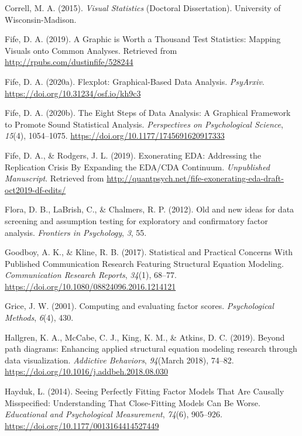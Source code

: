 \documentclass[
  english,
  doc]{apa6}
\newlength{\cslhangindent}
\newenvironment{cslreferences}%
  {\setlength{\parindent}{0pt}%
  \everypar{\setlength{\hangindent}{\cslhangindent}}\ignorespaces}%
  {\par}
\begin{document}
\begin{cslreferences}
\leavevmode\hypertarget{ref-Correll2015}{}%
Correll, M. A. (2015). \emph{Visual Statistics} (Doctoral Dissertation). University of Wisconsin-Madison.

\leavevmode\hypertarget{ref-Fife2019b}{}%
Fife, D. A. (2019). A Graphic is Worth a Thousand Test Statistics: Mapping Visuals onto Common Analyses. Retrieved from \url{http://rpubs.com/dustinfife/528244}

\leavevmode\hypertarget{ref-Fife2019c}{}%
Fife, D. A. (2020a). Flexplot: Graphical-Based Data Analysis. \emph{PsyArxiv}. \url{https://doi.org/10.31234/osf.io/kh9c3}

\leavevmode\hypertarget{ref-Fife2019e}{}%
Fife, D. A. (2020b). The Eight Steps of Data Analysis: A Graphical Framework to Promote Sound Statistical Analysis. \emph{Perspectives on Psychological Science}, \emph{15}(4), 1054--1075. \url{https://doi.org/10.1177/1745691620917333}

\leavevmode\hypertarget{ref-Fife2019a}{}%
Fife, D. A., \& Rodgers, J. L. (2019). Exonerating EDA: Addressing the Replication Crisis By Expanding the EDA/CDA Continuum. \emph{Unpublished Manuscript}. Retrieved from \url{http://quantpsych.net/fife-exonerating-eda-draft-oct2019-df-edits/}

\leavevmode\hypertarget{ref-flora2012old}{}%
Flora, D. B., LaBrish, C., \& Chalmers, R. P. (2012). Old and new ideas for data screening and assumption testing for exploratory and confirmatory factor analysis. \emph{Frontiers in Psychology}, \emph{3}, 55.

\leavevmode\hypertarget{ref-Goodboy2017}{}%
Goodboy, A. K., \& Kline, R. B. (2017). Statistical and Practical Concerns With Published Communication Research Featuring Structural Equation Modeling. \emph{Communication Research Reports}, \emph{34}(1), 68--77. \url{https://doi.org/10.1080/08824096.2016.1214121}

\leavevmode\hypertarget{ref-grice2001computing}{}%
Grice, J. W. (2001). Computing and evaluating factor scores. \emph{Psychological Methods}, \emph{6}(4), 430.

\leavevmode\hypertarget{ref-Hallgren2019a}{}%
Hallgren, K. A., McCabe, C. J., King, K. M., \& Atkins, D. C. (2019). Beyond path diagrams: Enhancing applied structural equation modeling research through data visualization. \emph{Addictive Behaviors}, \emph{94}(March 2018), 74--82. \url{https://doi.org/10.1016/j.addbeh.2018.08.030}

\leavevmode\hypertarget{ref-Hayduk2014}{}%
Hayduk, L. (2014). Seeing Perfectly Fitting Factor Models That Are Causally Misspecified: Understanding That Close-Fitting Models Can Be Worse. \emph{Educational and Psychological Measurement}, \emph{74}(6), 905--926. \url{https://doi.org/10.1177/0013164414527449}


\end{cslreferences}
\end{document}
